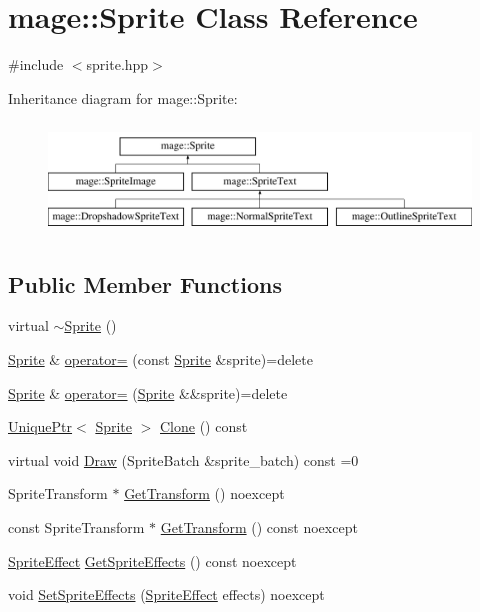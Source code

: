 \hypertarget{classmage_1_1_sprite}{}\section{mage\+:\+:Sprite Class Reference}
\label{classmage_1_1_sprite}


{\ttfamily \#include $<$sprite.\+hpp$>$}

Inheritance diagram for mage\+:\+:Sprite\+:\begin{figure}[H]
\begin{center}
\leavevmode
\includegraphics[height=3.000000cm]{classmage_1_1_sprite}
\end{center}
\end{figure}
\subsection*{Public Member Functions}
\begin{DoxyCompactItemize}
\item 
virtual \hyperlink{classmage_1_1_sprite_a0f184574f9c035d6fbb239c1868aa670}{$\sim$\+Sprite} ()
\item 
\hyperlink{classmage_1_1_sprite}{Sprite} \& \hyperlink{classmage_1_1_sprite_aa24dfc716d8b79cc16b4c27409f8cc6b}{operator=} (const \hyperlink{classmage_1_1_sprite}{Sprite} \&sprite)=delete
\item 
\hyperlink{classmage_1_1_sprite}{Sprite} \& \hyperlink{classmage_1_1_sprite_a808d87aeb6d652f9a53e967a75a1eede}{operator=} (\hyperlink{classmage_1_1_sprite}{Sprite} \&\&sprite)=delete
\item 
\hyperlink{namespacemage_a3316d7143a973e37adf1110f2e80ca31}{Unique\+Ptr}$<$ \hyperlink{classmage_1_1_sprite}{Sprite} $>$ \hyperlink{classmage_1_1_sprite_a66e27a8a98ac5a4289e8440ef8193718}{Clone} () const
\item 
virtual void \hyperlink{classmage_1_1_sprite_a954a9f2046edcd6b1658a236ae23ec5a}{Draw} (Sprite\+Batch \&sprite\+\_\+batch) const =0
\item 
Sprite\+Transform $\ast$ \hyperlink{classmage_1_1_sprite_aa28e031e38c51619b3bd7853d212ae06}{Get\+Transform} () noexcept
\item 
const Sprite\+Transform $\ast$ \hyperlink{classmage_1_1_sprite_a8e2c0ae634492efacc92aab2e18e701c}{Get\+Transform} () const noexcept
\item 
\hyperlink{namespacemage_a9cfe18123066ba4236f548f9de75d881}{Sprite\+Effect} \hyperlink{classmage_1_1_sprite_a1a969b7cf3f1892894710a80582b4cd2}{Get\+Sprite\+Effects} () const noexcept
\item 
void \hyperlink{classmage_1_1_sprite_abeefc8ed41e55924be83ba7b480aa40e}{Set\+Sprite\+Effects} (\hyperlink{namespacemage_a9cfe18123066ba4236f548f9de75d881}{Sprite\+Effect} effects) noexcept
\end{DoxyCompactItemize}
